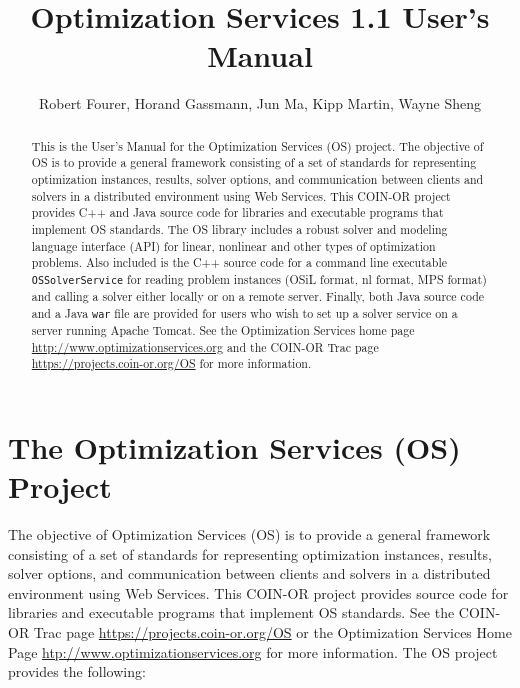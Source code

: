\documentclass[11pt]{article}
\renewcommand{\_}{{\char"5F}}
\renewcommand{\{}{{\char"7B}}
\renewcommand{\}}{{\char"7D}}
\renewcommand{\^}{{\char"0D}}
\renewcommand{\'}{{\char"0D}}
\begin{document}

\title{Optimization Services 1.1 User's Manual }
\vskip 2in
\author{Robert Fourer, Horand Gassmann, Jun Ma,  Kipp Martin, Wayne Sheng}
\maketitle

\begin{abstract}
This is the User's Manual for the Optimization Services (OS) project.  The objective of OS is to provide a 
general framework consisting of a set of standards for representing optimization instances, results, 
solver options, and communication between clients and solvers in a distributed environment using Web Services. 
This COIN-OR project provides C++ and Java source code for libraries and executable programs that implement 
OS standards.   The OS library includes a robust solver and modeling language interface (API) for linear, 
nonlinear and other types of optimization problems.   Also included is the C++ source code for a  command line 
executable {\tt OSSolverService}  for reading problem instances (OSiL format, nl format, MPS format) and 
calling a solver either locally or on a remote server.  Finally,  both Java source code and a Java {\tt war} file
are provided for users who wish to set up a solver service on a server running Apache Tomcat.   
See the Optimization Services home page \url{http://www.optimizationservices.org} and the COIN-OR Trac page 
\url{https://projects.coin-or.org/OS} for more information.
\end{abstract}


\newpage
\tableofcontents
\listoffigures
\listoftables
{}



\newpage

\section{The Optimization Services (OS) Project}

The objective of Optimization Services (OS) is to provide a general framework consisting of a set of standards 
for representing optimization instances, results, solver options, and communication between clients and solvers 
in a distributed environment using Web Services. This COIN-OR project provides source code for libraries and 
executable programs that implement OS standards.  See the COIN-OR Trac page \url{https://projects.coin-or.org/OS}%
or the Optimization Services Home Page \url{htp://www.optimizationservices.org} 
for more information. 
The OS project provides the following:
\end{document}
